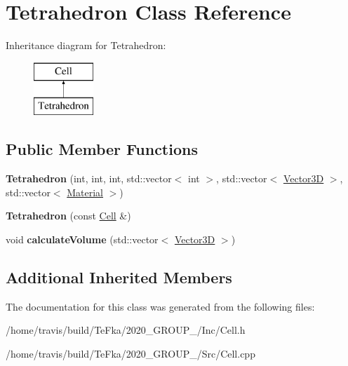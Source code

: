 \hypertarget{class_tetrahedron}{}\section{Tetrahedron Class Reference}
\label{class_tetrahedron}
Inheritance diagram for Tetrahedron\+:\begin{figure}[H]
\begin{center}
\leavevmode
\includegraphics[height=2.000000cm]{class_tetrahedron}
\end{center}
\end{figure}
\subsection*{Public Member Functions}
\begin{DoxyCompactItemize}
\item 
{\bfseries Tetrahedron} (int, int, int, std\+::vector$<$ int $>$, std\+::vector$<$ \hyperlink{class_vector3_d}{Vector3D} $>$, std\+::vector$<$ \hyperlink{class_material}{Material} $>$)\hypertarget{class_tetrahedron_ab98a7c969ce1346e669d9ddf50130277}{}\label{class_tetrahedron_ab98a7c969ce1346e669d9ddf50130277}

\item 
{\bfseries Tetrahedron} (const \hyperlink{class_cell}{Cell} \&)\hypertarget{class_tetrahedron_a5354ba6af7ce91ffbc4a5b84df470bd7}{}\label{class_tetrahedron_a5354ba6af7ce91ffbc4a5b84df470bd7}

\item 
void {\bfseries calculate\+Volume} (std\+::vector$<$ \hyperlink{class_vector3_d}{Vector3D} $>$)\hypertarget{class_tetrahedron_a9774470bf91e164e3d8c589a9ec95857}{}\label{class_tetrahedron_a9774470bf91e164e3d8c589a9ec95857}

\end{DoxyCompactItemize}
\subsection*{Additional Inherited Members}


The documentation for this class was generated from the following files\+:\begin{DoxyCompactItemize}
\item 
/home/travis/build/\+Te\+Fka/2020\+\_\+\+G\+R\+O\+U\+P\+\_/\+Inc/Cell.\+h\item 
/home/travis/build/\+Te\+Fka/2020\+\_\+\+G\+R\+O\+U\+P\+\_/\+Src/Cell.\+cpp\end{DoxyCompactItemize}
